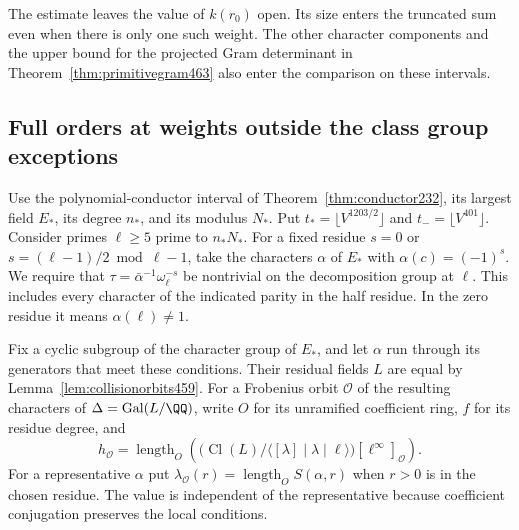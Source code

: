 \documentclass[a4paper,11pt]{article}
\theoremstyle{definition}
\theoremstyle{remark}
\numberwithin{equation}{section}
\newcommand{\Cl}{\operatorname{Cl}}
\begin{document}
The estimate leaves the value of \(k(r_0)\) open. Its size enters
the truncated sum even when there is only one such weight. The
other character components and the upper bound for the projected
Gram determinant in Theorem~\ref{thm:primitivegram463} also enter
the comparison on these intervals.


\subsection{Full orders at weights outside the class group exceptions}
\label{sec:nonsplitcounts466}

Use the polynomial-conductor interval of Theorem~\ref{thm:conductor232},
its largest field \(E_*\), its degree \(n_*\), and its modulus \(N_*\).
Put \(t_*=\lfloor V^{1203/2}\rfloor\) and \(t_-=\lfloor V^{401}\rfloor\).
Consider primes \(\ell\ge5\) prime to \(n_*N_*\). For a fixed residue
\(s=0\) or \(s=(\ell-1)/2\bmod{\ell-1}\), take the characters
\(\alpha\) of \(E_*\) with \(\alpha(c)=(-1)^s\). We require that
\(\tau=\bar\alpha^{-1}\omega_\ell^{-s}\) be nontrivial on the
decomposition group at \(\ell\). This includes every character of
the indicated parity in the half residue. In the zero residue it
means \(\alpha(\ell)\ne1\).

Fix a cyclic subgroup of the character group of \(E_*\), and let
\(\alpha\) run through its generators that meet these conditions.
Their residual fields \(L\) are equal by Lemma~\ref{lem:collisionorbits459}.
For a Frobenius orbit \(\mathcal O\) of the resulting characters
of \(\Delta=\operatorname{Gal}(L/\QQ)\), write \(O\) for its
unramified coefficient ring, \(f\) for its residue degree, and
\[
 h_{\mathcal O}=\operatorname{length}_O
   \left(\bigl(\Cl(L)/\langle[\lambda]\mid\lambda\mid\ell\rangle\bigr)
                    [\ell^\infty]_{\mathcal O}\right).
\]
For a representative \(\alpha\) put
\(\lambda_{\mathcal O}(r)=\operatorname{length}_O S(\alpha,r)\)
when \(r>0\) is in the chosen residue. The value is independent
of the representative because coefficient conjugation preserves
the local conditions.
\end{document}

